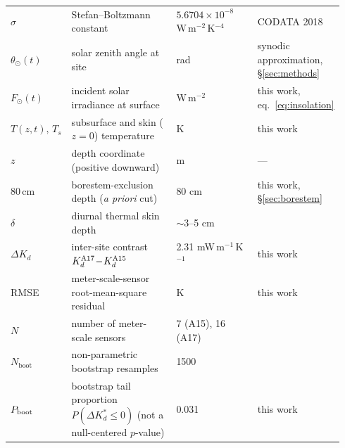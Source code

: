 \documentclass[11pt]{article}
\newcommand{\zborestem}{80\,\si{\centi\meter}}
\begin{document}
{\begin{tabular}{@{}p{0.10\linewidth}p{0.40\linewidth}p{0.28\linewidth}p{0.16\linewidth}@{}}
$\sigma$           & Stefan--Boltzmann constant                            & $5.6704\!\times\!10^{-8}$ W\,m$^{-2}$\,K$^{-4}$ & CODATA 2018 \\
$\theta_\odot(t)$  & solar zenith angle at site                            & rad                                          & synodic approximation, \S\ref{sec:methods} \\
$F_\odot(t)$       & incident solar irradiance at surface                  & W\,m$^{-2}$                                  & this work, eq.~\ref{eq:insolation} \\
$T(z,t),\,T_s$     & subsurface and skin ($z\!=\!0$) temperature           & K                                            & this work \\
$z$                & depth coordinate (positive downward)                  & m                                            & --- \\
$\zborestem$       & borestem-exclusion depth (\emph{a priori} cut)        & 80 cm                                        & this work, \S\ref{sec:borestem} \\
$\delta$           & diurnal thermal skin depth                            & $\sim$3--5 cm                                & \citet{hayne2017} \\
$\Delta K_d$       & inter-site contrast $K_d^{\rm A17}\!-\!K_d^{\rm A15}$ & 2.31 mW\,m$^{-1}$\,K$^{-1}$                  & this work \\
RMSE               & meter-scale-sensor root-mean-square residual                 & K                                            & this work \\
$N$                & number of meter-scale sensors                                & 7 (A15), 16 (A17)                            & \citet{nagihara2018} \\
$N_\mathrm{boot}$  & non-parametric bootstrap resamples                    & 1500                                         & \citet{efron1993} \\
$P_{\rm boot}$     & bootstrap tail proportion $P(\Delta K_d^{*}\le 0)$ (not a null-centered $p$-value) & 0.031                                         & this work \\
\bottomrule
\end{tabular}

}
\end{document}
